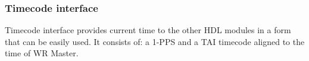 \subsubsection{Timecode interface}
\label{sec:wrpc_timecode}

Timecode interface provides current time to the other HDL modules in a form that
can be easily used. It consists of: a 1-PPS and a TAI timecode
aligned to the time of WR Master.

